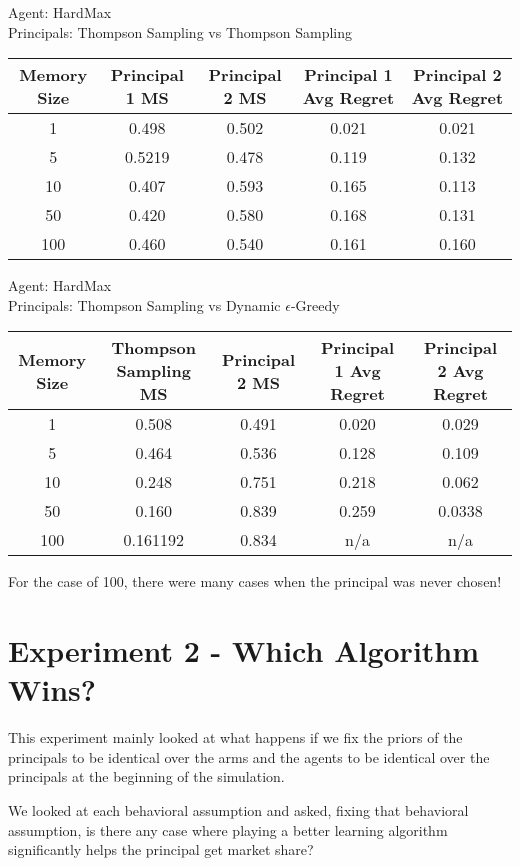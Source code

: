\documentclass[a4paper]{article}
\begin{document}
\begin{center}
Agent: HardMax \\Principals: Thompson Sampling vs Thompson Sampling
 \begin{tabular}{||c c c c c||} 
 \hline
 Memory Size & Principal 1 MS & Principal 2 MS & Principal 1 Avg Regret & Principal 2 Avg Regret  \\ [0.5ex] 
 \hline\hline
 1 & 0.498 & 0.502 & 0.021 & 0.021 \\ 
 \hline
 5 & 0.5219 & 0.478 &  0.119 &  0.132 \\
 \hline
 10 & 0.407 & 0.593 & 0.165  & 0.113 \\
 \hline
 50 & 0.420 & 0.580 & 0.168 & 0.131 \\
 \hline
 100 & 0.460 & 0.540 & 0.161 & 0.160 \\ [1ex] 
 \hline
\end{tabular}

\vspace{0.75cm}
Agent: HardMax \\Principals: Thompson Sampling vs Dynamic $\epsilon$-Greedy
 \begin{tabular}{||c c c c c||} 
 \hline
 Memory Size & Thompson Sampling MS & Principal 2 MS & Principal 1 Avg Regret & Principal 2 Avg Regret  \\ [0.5ex] 
 \hline\hline
 1 & 0.508 & 0.491 & 0.020 & 0.029 \\ 
 \hline
 5 & 0.464 & 0.536 &  0.128 &  0.109 \\
 \hline
 10 & 0.248 & 0.751 & 0.218  & 0.062 \\
 \hline
 50 & 0.160 & 0.839 & 0.259 & 0.0338 \\
 \hline
 100 & 0.161192 & 0.834 & n/a & n/a \\ [1ex] 
 \hline
\end{tabular}
\end{center}
For the case of 100, there were many cases when the principal was never chosen!

\section*{Experiment 2 - Which Algorithm Wins?}
This experiment mainly looked at what happens if we fix the priors of the principals to be identical over the arms and the agents to be identical over the principals at the beginning of the simulation. 

We looked at each behavioral assumption and asked, fixing that behavioral assumption, is there any case where playing a better learning algorithm significantly helps the principal get market share?
\end{document}
